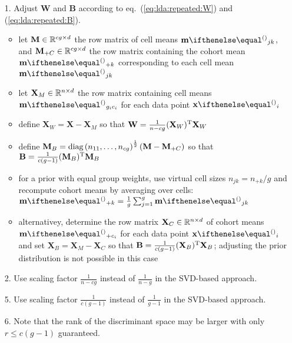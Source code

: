\documentclass[a4paper]{article}
\begin{document}
\begin{enumerate}
\item[1.] Adjust $\mathbf{W}$ and $\mathbf{B}$ according to eq.~(\ref{eq:lda:repeated:W}) and (\ref{eq:lda:repeated:B}).
  \begin{itemize}
  \item let $\mathbf{M}\in \mathbb{R}^{cg\times d}$ the row matrix of cell means $\vm_{jk}$, and $\mathbf{M}_{+C} \in \mathbb{R}^{cg\times d}$ the row matrix containing the cohort mean $\vm_{+k}$ corresponding to each cell mean $\vm_{jk}$
  \item let $\mathbf{X}_M\in \mathbb{R}^{n\times d}$ the row matrix containing cell means $\vm_{g_i c_i}$ for each data point $\vx_i$
  \item define $\mathbf{X}_W = \mathbf{X} - \mathbf{X}_M$ so that $\mathbf{W} = \frac1{n - cg} (\mathbf{X}_W)^{\text{T}} \mathbf{X}_W$
  \item define $\mathbf{M}_B = \mathop{\text{diag}}\left(n_{11}, \ldots, n_{cg}\right)^{\frac12} (\mathbf{M} - \mathbf{M}_{+C})$ so that $\mathbf{B} = \frac{1}{c (g - 1)} (\mathbf{M}_B)^{\text{T}} \mathbf{M}_B$
  \item for a prior with equal group weights, use virtual cell sizes $n_{jk} = n_{+k} / g$ and recompute cohort means by averaging over cells: $\vm_{+k} = \frac1g \sum_{j=1}^g \vm_{jk}$
  \item alternativey, determine the row matrix $\mathbf{X}_C\in \mathbb{R}^{n\times d}$ of cohort means $\vm_{+ c_i}$ for each data point $\vx_i$ and set $\mathbf{X}_B = \mathbf{X}_M - \mathbf{X}_C$ so that $\mathbf{B} = \frac{1}{c (g - 1)} (\mathbf{X}_B)^{\text{T}} \mathbf{X}_B$; adjusting the prior distribution is not possible in this case 
  \end{itemize}
\item[2.] Use scaling factor $\frac1{n - cg}$ instead of $\frac1{n - g}$ in the SVD-based approach.
\item[5.] Use scaling factor $\frac1{c (g - 1)}$ instead of $\frac1{g - 1}$ in the SVD-based approach.
\item[6.] Note that the rank of the discriminant space may be larger with only $r \leq c(g - 1)$ guaranteed.
\end{enumerate}


\end{document}
